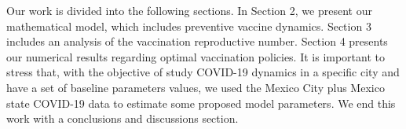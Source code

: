 Our work is divided into the following sections. In Section 2, we present our mathematical model, which includes preventive vaccine dynamics. Section 3 includes an analysis of the vaccination reproductive number. Section 4 presents our numerical results regarding optimal vaccination policies. It is important to stress that, with the objective of study COVID-19 dynamics in a specific city and have a set of baseline parameters values, we used the Mexico City plus Mexico state COVID-19 data to estimate some proposed model parameters. We end this work with a conclusions and discussions section.